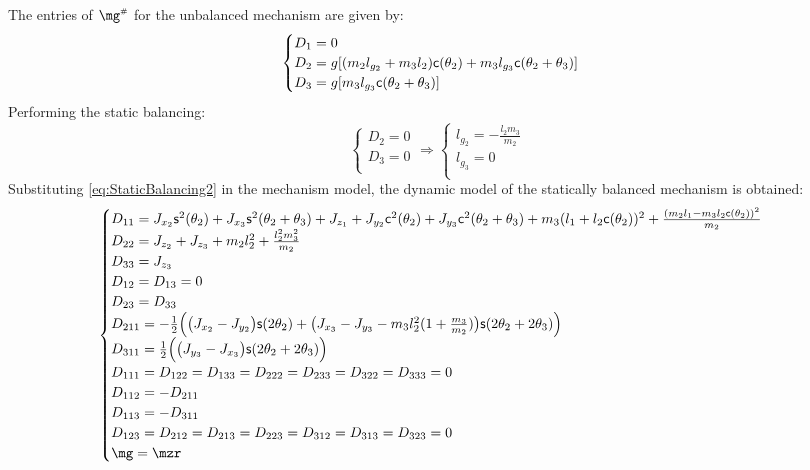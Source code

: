 \documentclass[a4paper,11pt,brazil,fleqn]{article}
\begin{document}
The entries of $\mg\ssh$ for the unbalanced mechanism are given by:
\begin{equation}
\begin{cases}\label{eq:gh2}
D_1 = 0 \\
D_2 = g[ (m_2 l_{g_2} + m_3 l_2  ) \mathsf{c}(\theta_2) + m_3 l_{g_3} \mathsf{c}(\theta_2 + \theta_3) ]  \\
D_3 = g[ m_3 l_{g_3} \mathsf{c}(\theta_2 + \theta_3)  ] \\
\end{cases}
\end{equation} 
Performing the static balancing:
\begin{equation}\label{eq:StaticBalancing2}
\begin{cases}
D_2 = 0 \\
D_3 = 0 \\
\end{cases}
\Rightarrow
\begin{cases}
l_{g_2} = -\frac{l_2 m_3}{m_2} \\
l_{g_3} = 0 \\
\end{cases}
\end{equation}
Substituting \eqref{eq:StaticBalancing2} in the mechanism model, the dynamic model of the statically balanced mechanism is obtained:
\begin{equation}\label{eq:StaticBalanced2}
\begin{cases}
D_{11} = J_{x_2}\ssin^2(\theta_2) + J_{x_3}\ssin^2(\theta_2+\theta_3) + J_{z_1} + J_{y_2}\ccos^2(\theta_2) + J_{y_3}\ccos^2(\theta_2+\theta_3) + m_3 (l_1 + l_2 \ccos(\theta_2))^2 + \frac{(m_2 l_1 - m_3 l_2 \ccos(\theta_2))^2}{m_2} \\
D_{22} = J_{z_2} + J_{z_3} + m_2 l_2^2 + \frac{l_2^2 m_3^2}{m_2} \\
D_{33} = J_{z_3} \\
D_{12} = D_{13} = 0 \\
D_{23} = D_{33} \\
D_{211} = -\frac{1}{2} \Big( \big( J_{x_2} - J_{y_2} \big) \ssin(2\theta_2) + \big(J_{x_3} - J_{y_3} - m_3 l_2^2 ( 1 + \frac{m_3}{m_2} )\big)\ssin(2\theta_2+2\theta_3)    \Big) \\
D_{311} = \frac{1}{2} \Big( \big(J_{y_3} - J_{x_3} \big)\ssin(2\theta_2+2\theta_3) \Big) \\
D_{111} = D_{122} = D_{133} = D_{222} = D_{233} = D_{322} = D_{333} = 0 \\
D_{112} = - D_{211} \\
D_{113} = - D_{311} \\
D_{123} = D_{212} = D_{213} = D_{223} = D_{312} = D_{313} = D_{323} = 0 \\
\mg = \mzr
\end{cases}
\end{equation}
\end{document}
